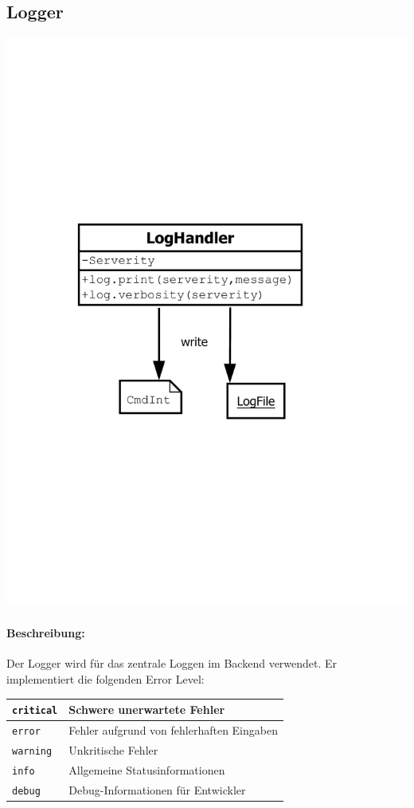 \subsection{Logger}
\includegraphics[width=\textwidth]{design/backend/gfx/LogHandler.pdf}
\paragraph{Beschreibung:}
\label{par:beschreibung}


\label{sub:logger}
Der Logger wird für das zentrale Loggen im Backend verwendet. Er implementiert die folgenden Error Level:

\begin{table}[h]
\centering
\begin{tabular}{|l|l|}
    \hline
    \texttt{critical} & Schwere unerwartete Fehler \\
    \hline
    \texttt{error} & Fehler aufgrund von fehlerhaften Eingaben \\
    \hline
    \texttt{warning} & Unkritische Fehler \\
    \hline
    \texttt{info} & Allgemeine Statusinformationen \\
    \hline
    \texttt{debug} & Debug-Informationen für Entwickler \\
    \hline
\end{tabular} 
\end{table}


